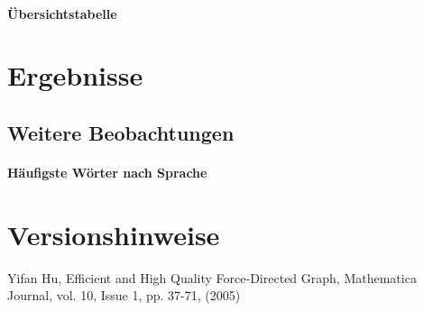 \documentclass[12pt, a4paper]{article}
\begin{document}
\paragraph{Übersichtstabelle}
\section{Ergebnisse}
\subsection{Weitere Beobachtungen}
\paragraph{H\"aufigste W\"orter nach Sprache}
\section{Versionshinweise}

\newpage
\begin{thebibliography}{9}
	 Yifan Hu, Efficient and High Quality Force-Directed Graph, Mathematica Journal, vol. 10, Issue 1, pp. 37-71, (2005)
\end{thebibliography}
\end{document}
